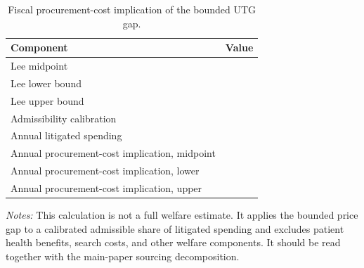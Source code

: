 \begin{table}[ht]
\centering
\caption{Fiscal procurement-cost implication of the bounded UTG gap.}
\label{tab:procurement_cost_bound}
\begin{threeparttable}
\begin{tabular}{lr}
\toprule
Component & Value \\
\midrule
Lee midpoint & \BPprocCostBoundUTGmidPct{} \\
Lee lower bound & \BPutgBoundLow{} \\
Lee upper bound & \BPutgBoundHigh{} \\
Admissibility calibration & \BPprocCostBoundAdmissibility{} \\
Annual litigated spending & \BPprocCostBoundAnnualSpend{} \\
Annual procurement-cost implication, midpoint & \BPprocCostBound{} \\
Annual procurement-cost implication, lower & \BPprocCostBoundCIlow{} \\
Annual procurement-cost implication, upper & \BPprocCostBoundCIhigh{} \\
\bottomrule
\end{tabular}
\begin{tablenotes}[flushleft]\footnotesize
\item \textit{Notes:} This calculation is not a full welfare estimate. It applies the bounded price gap to a calibrated admissible share of litigated spending and excludes patient health benefits, search costs, and other welfare components. It should be read together with the main-paper sourcing decomposition.
\end{tablenotes}
\end{threeparttable}
\end{table}

